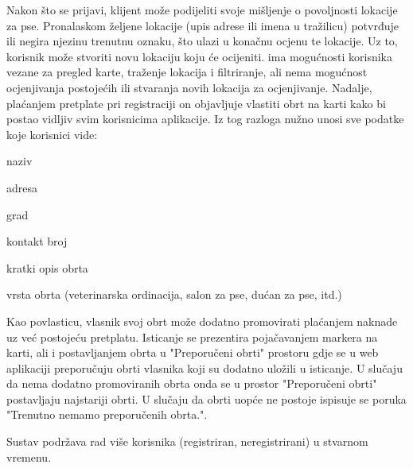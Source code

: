 		Nakon što se prijavi, klijent može podijeliti svoje mišljenje o povoljnosti lokacije za pse. Pronalaskom željene lokacije (upis adrese ili imena u tražilicu) potvrđuje ili negira njezinu trenutnu oznaku, što ulazi u konačnu ocjenu te lokacije. Uz to, korisnik može stvoriti novu lokaciju koju će ocijeniti.\newline
		 ima mogućnosti korisnika vezane za pregled karte, traženje lokacija i filtriranje, ali nema mogućnost ocjenjivanja postojećih ili stvaranja novih lokacija za ocjenjivanje. Nadalje, plaćanjem pretplate pri registraciji on objavljuje vlastiti obrt na karti kako bi postao vidljiv svim korisnicima aplikacije. Iz tog razloga nužno unosi sve podatke koje korisnici vide:
		\begin{packed_item}
			\item {naziv}
			\item {adresa}
            \item {grad}
			\item {kontakt broj}
			\item {kratki opis obrta}
			\item {vrsta obrta (veterinarska ordinacija, salon za pse, dućan za pse, itd.)}
		\end{packed_item}
  
		Kao povlasticu, vlasnik svoj obrt može dodatno promovirati plaćanjem naknade uz već postojeću pretplatu. Isticanje se prezentira pojačavanjem markera na karti, ali i postavljanjem obrta u "Preporučeni obrti" prostoru gdje se u web aplikaciji preporučuju obrti vlasnika koji su dodatno uložili u isticanje. U slučaju da nema dodatno promoviranih obrta onda se u prostor "Preporučeni obrti" postavljaju najstariji obrti. U slučaju da obrti uopće ne postoje ispisuje se poruka "Trenutno nemamo preporučenih obrta.". \newline
  
		Sustav podržava rad više korisnika (registriran, neregistrirani) u stvarnom vremenu.
		
		
		
		
		\eject
		
	